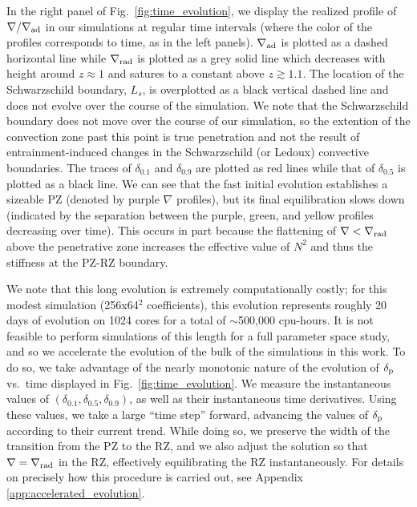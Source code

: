 \documentclass[twocolumn]{aastex631}
\newcommand{\gradrad}{\ensuremath{\nabla_{\rm{rad}}}}
\newcommand{\gradad}{\ensuremath{\nabla_{\rm{ad}}}}
\newcommand{\justgrad}{\ensuremath{\nabla}}
\newcommand{\delp}{\ensuremath{\delta_{\rm{p}}}}
\begin{document}
In the right panel of Fig.~\ref{fig:time_evolution}, we display the realized profile of $\justgrad/\gradad$ in our simulations at regular time intervals (where the color of the profiles corresponds to time, as in the left panels).
$\gradad$ is plotted as a dashed horizontal line while $\gradrad$ is plotted as a grey solid line which decreases with height around $z \approx 1$ and satures to a constant above $z \gtrsim 1.1$.
The location of the Schwarzschild boundary, $L_s$, is overplotted as a black vertical dashed line and does not evolve over the course of the simulation.
We note that the Schwarzschild boundary does not move over the course of our simulation, so the extention of the convection zone past this point is true penetration and not the result of entrainment-induced changes in the Schwarzschild (or Ledoux) convective boundaries.
The traces of $\delta_{0.1}$ and $\delta_{0.9}$ are plotted as red lines while that of $\delta_{0.5}$ is plotted as a black line.
We can see that the fast initial evolution establishes a sizeable PZ (denoted by purple $\justgrad$ profiles), but its final equilibration slows down (indicated by the separation between the purple, green, and yellow profiles decreasing over time).
This occurs in part because the flattening of $\justgrad < \gradrad$ above the penetrative zone increases the effective value of $N^2$ and thus the stiffness at the PZ-RZ boundary.

We note that this long evolution is extremely computationally costly; for this modest simulation (256x64$^2$ coefficients), this evolution represents roughly 20 days of evolution on 1024 cores for a total of $\sim$500,000 cpu-hours.
It is not feasible to perform simulations of this length for a full parameter space study, and so we accelerate the evolution of the bulk of the simulations in this work.
To do so, we take advantage of the nearly monotonic nature of the evolution of $\delp$ vs.~time displayed in Fig.~\ref{fig:time_evolution}.
We measure the instantaneous values of $(\delta_{0.1}, \delta_{0.5}, \delta_{0.9})$, as well as their instantaneous time derivatives.
Using these values, we take a large ``time step'' forward, advancing the values of $\delp$ according to their current trend.
While doing so, we preserve the width of the transition from the PZ to the RZ, and we also adjust the solution so that $\justgrad = \gradrad$ in the RZ, effectively equilibrating the RZ instantaneously.
For details on precisely how this procedure is carried out, see Appendix \ref{app:accelerated_evolution}.
\end{document}
